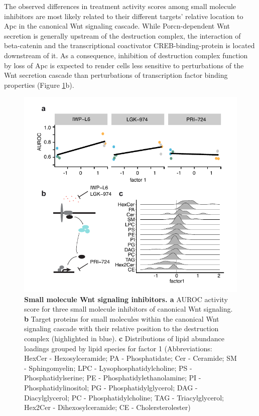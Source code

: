 \begin{flushleft}
\bigbreak
The observed differences in treatment activity scores among small molecule inhibitors are most likely related to their different targets' relative location to Apc in the canonical Wnt signaling cascade. While Porcn-dependent Wnt secretion is generally upstream of the destruction complex, the interaction of beta-catenin and the transcriptional coactivator CREB-binding-protein is located downstream of it. As a consequence, inhibition of destruction complex function by loss of Apc is expected to render cells less sensitive to perturbations of the Wnt secretion cascade than perturbations of transcription factor binding properties (Figure \ref{fig_199}b). 

\begin{figure}[h!]
\centering
\includegraphics[scale=0.75,keepaspectratio]{figures/adenomaprofiling/pdf/fig_2_2.pdf}
\caption{\textbf{Small molecule Wnt signaling inhibitors. a} AUROC activity score for three small molecule inhibitors of canonical Wnt signaling. \textbf{b} Target proteins for small molecules within the canonical Wnt signaling cascade with their relative position to the destruction complex (highlighted in blue). \textbf{c} Distributions of lipid abundance loadings grouped by lipid species for factor 1 (Abbreviations: HexCer - Hexosylceramide; PA - Phosphatidate; Cer - Ceramide; SM - Sphingomyelin; LPC - Lysophosphatidylcholine; PS - Phosphatidylserine; PE - Phosphatidylethanolamine; PI - Phosphatidylinositol; PG - Phosphatidylglycerol; DAG - Diacylglycerol; PC - Phosphatidylcholine; TAG - Triacylglycerol; Hex2Cer - Dihexosylceramide; CE - Cholersterolester)}
\label{fig_199}
\end{figure}
\bigbreak


\end{flushleft}
